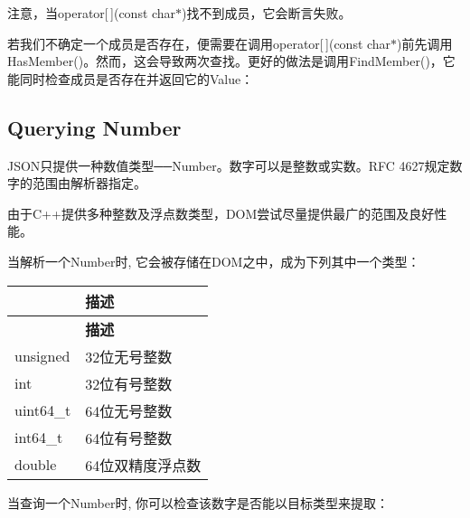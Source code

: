 注意，当{\ttfamily operator\mbox{[}$\,$\mbox{]}(const char$\ast$)}找不到成员，它会断言失败。

若我们不确定一个成员是否存在，便需要在调用{\ttfamily operator\mbox{[}$\,$\mbox{]}(const char$\ast$)}前先调用{\ttfamily Has\+Member()}。然而，这会导致两次查找。更好的做法是调用{\ttfamily Find\+Member()}，它能同时检查成员是否存在并返回它的\+Value：


\hypertarget{md_Cadriciel_Commun_Externe_RapidJSON_doc_tutorial.zh-cn_QueryNumber}{}\subsection{Querying Number}\label{md_Cadriciel_Commun_Externe_RapidJSON_doc_tutorial.zh-cn_QueryNumber}
J\+S\+O\+N只提供一种数值类型──\+Number。数字可以是整数或实数。\+R\+FC 4627规定数字的范围由解析器指定。

由于\+C++提供多种整数及浮点数类型，\+D\+O\+M尝试尽量提供最广的范围及良好性能。

当解析一个\+Number时, 它会被存储在\+D\+O\+M之中，成为下列其中一个类型：

\tabulinesep=1mm
\begin{longtabu} spread 0pt [c]{*2{|X[-1]}|}
\hline
{}&{\bf 描述  }\\
\endfirsthead
\hline
\endfoot
\hline
{}&{\bf 描述  }\\
\endhead
{\ttfamily unsigned} &32位无号整数 \\
{\ttfamily int} &32位有号整数 \\
{\ttfamily uint64\+\_\+t} &64位无号整数 \\
{\ttfamily int64\+\_\+t} &64位有号整数 \\
{\ttfamily double} &64位双精度浮点数 \\
\end{longtabu}
当查询一个\+Number时, 你可以检查该数字是否能以目标类型来提取：

